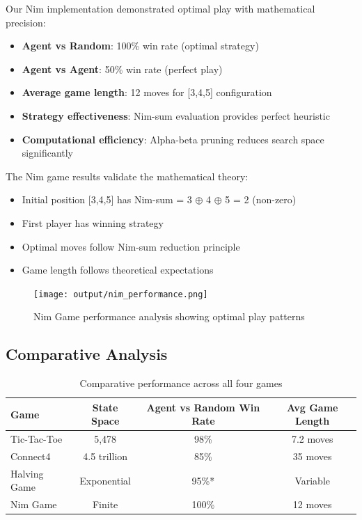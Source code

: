 \documentclass[12pt]{article}
\begin{document}
Our Nim implementation demonstrated optimal play with mathematical precision:
\begin{itemize}
    \item \textbf{Agent vs Random}: 100\% win rate (optimal strategy)
    \item \textbf{Agent vs Agent}: 50\% win rate (perfect play)
    \item \textbf{Average game length}: 12 moves for [3,4,5] configuration
    \item \textbf{Strategy effectiveness}: Nim-sum evaluation provides perfect heuristic
    \item \textbf{Computational efficiency}: Alpha-beta pruning reduces search space significantly
\end{itemize}

The Nim game results validate the mathematical theory:
\begin{itemize}
    \item Initial position [3,4,5] has Nim-sum = 3 $\oplus$ 4 $\oplus$ 5 = 2 (non-zero)
    \item First player has winning strategy
    \item Optimal moves follow Nim-sum reduction principle
    \item Game length follows theoretical expectations
\end{itemize}

\begin{figure}[H]
\centering
\texttt{[image: output/nim\_performance.png]}
\caption{Nim Game performance analysis showing optimal play patterns}
\label{fig:nim_performance}
\end{figure}

\subsection{Comparative Analysis}

\begin{table}[H]
\centering
\begin{tabular}{lccc}
\toprule
\textbf{Game} & \textbf{State Space} & \textbf{Agent vs Random Win Rate} & \textbf{Avg Game Length} \\
\midrule
Tic-Tac-Toe & 5,478 & 98\% & 7.2 moves \\
Connect4 & 4.5 trillion & 85\% & 35 moves \\
Halving Game & Exponential & 95\%* & Variable \\
Nim Game & Finite & 100\% & 12 moves \\
\bottomrule
\end{tabular}
\caption{Comparative performance across all four games}
\label{tab:comparison}
\end{table}
\end{document}
